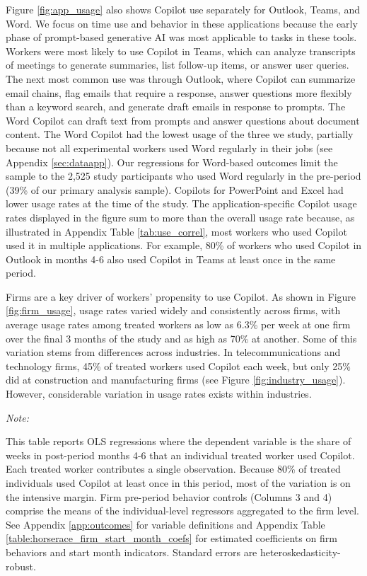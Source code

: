\documentclass{article}
\newenvironment{tablenotes}{
    \begin{flushleft} \small
    \textit{Note:} 
}{
    \end{flushleft}
}
\begin{document}
Figure \ref{fig:app_usage} also shows Copilot use separately for Outlook, Teams, and Word. We focus on time use and behavior in these applications because the early phase of prompt-based generative AI was most applicable to tasks in these tools. Workers were most likely to use Copilot in Teams, which can analyze transcripts of meetings to generate summaries, list follow-up items, or answer user queries. The next most common use was through Outlook, where Copilot can summarize email chains, flag emails that require a response, answer questions more flexibly than a keyword search, and generate draft emails in response to prompts. The Word Copilot can draft text from prompts and answer questions about document content. The Word Copilot had the lowest usage of the three we study, partially because not all experimental workers used Word regularly in their jobs (see Appendix \ref{sec:dataapp}). Our regressions for Word-based outcomes limit the sample to the 2,525 study participants who used Word regularly in the pre-period (39\% of our primary analysis sample). Copilots for PowerPoint and Excel had lower usage rates at the time of the study. The application-specific Copilot usage rates displayed in the figure sum to more than the overall usage rate because, as illustrated in Appendix Table \ref{tab:use_correl}, most workers who used Copilot used it in multiple applications. For example, 80\% of workers who used Copilot in Outlook in months 4-6 also used Copilot in Teams at least once in the same period.

Firms are a key driver of workers' propensity to use Copilot. As shown in Figure \ref{fig:firm_usage}, usage rates varied widely and consistently across firms, with average usage rates among treated workers as low as 6.3\% per week at one firm over the final 3 months of the study and as high as 70\% at another. Some of this variation stems from differences across industries. In telecommunications and technology firms, 45\% of treated workers  used Copilot each week, but only 25\% did at construction and manufacturing firms (see Figure \ref{fig:industry_usage}). However, considerable variation in usage rates exists within industries. 


\begin{table}[htbp]
    \centering
    \caption{Predicting Adoption \label{table:horserace}}
    
    \begin{tablenotes}
       This table reports OLS regressions where the dependent variable is the share of weeks in post-period months 4-6 that an individual treated worker used Copilot. Each treated worker contributes a single observation. Because 80\% of treated individuals used Copilot at least once in this period, most of the variation is on the intensive margin. Firm pre-period behavior controls (Columns 3 and 4) comprise the means of the individual-level regressors aggregated to the firm level. See Appendix \ref{app:outcomes} for variable definitions and Appendix Table \ref{table:horserace_firm_start_month_coefs} for estimated coefficients on firm behaviors and start month indicators. Standard errors are heteroskedasticity-robust.
    \end{tablenotes}
\end{table}
\end{document}
